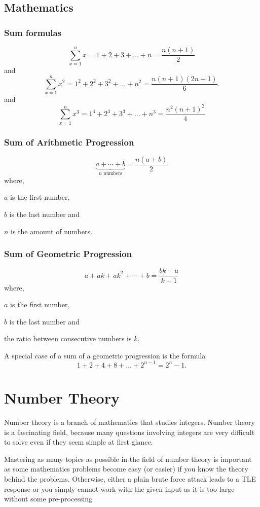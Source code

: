\documentclass[twoside,12pt,a4paper,english]{book}
\theoremstyle{definition}
\theoremstyle{problemstyle}
\begin{document}
\section{Mathematics}

\subsection{Sum formulas}

\[\sum_{x=1}^n x = 1+2+3+\ldots+n = \frac{n(n+1)}{2}\]
and
\[\sum_{x=1}^n x^2 = 1^2+2^2+3^2+\ldots+n^2 = \frac{n(n+1)(2n+1)}{6}.\]
and
\[\sum_{x=1}^n x^3 = 1^3+2^3+3^3+\ldots+n^3 = \frac{n^2(n+1)^2}{4}\]

\subsection{Sum of Arithmetic Progression}

\[\underbrace{a + \cdots + b}_{n \,\, \textrm{numbers}} = \frac{n(a+b)}{2}\]
where,

$a$ is the first number,

$b$ is the last number and

$n$ is the amount of numbers.

\subsection{Sum of Geometric Progression}
\[a + ak + ak^2 + \cdots + b = \frac{bk-a}{k-1}\]
where,

$a$ is the first number,

$b$ is the last number and

the ratio between consecutive numbers is $k$.

A special case of a sum of a geometric progression is the formula
\[1+2+4+8+\ldots+2^{n-1}=2^n-1.\]

\chapter{Number Theory}

Number theory is a branch of mathematics that studies integers. Number
theory is a fascinating field, because many questions involving integers are very
difficult to solve even if they seem simple at first glance.

Mastering as many topics as possible in the field of number theory is important as some
mathematics problems become easy (or easier) if you know the theory behind the problems.
Otherwise, either a plain brute force attack leads to a TLE response or you simply cannot
work with the given input as it is too large without some pre-processing
\end{document}

